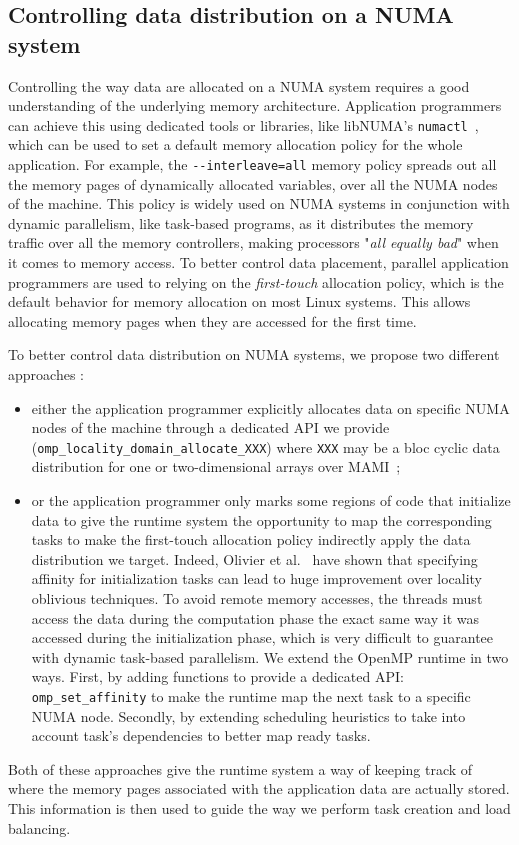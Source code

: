 \documentclass[parallelisme]{compas2016}
\begin{document}
\subsection{Controlling data distribution on a NUMA system}

Controlling the way data are allocated on a NUMA system requires a good understanding of the underlying memory architecture.
Application programmers can achieve this using dedicated tools or libraries, like libNUMA's \verb!numactl!~\cite{DBLP:journals/corr/abs-1101-0093}, which can be used to set a default memory allocation policy for the whole application.
For example, the \verb!--interleave=all! memory policy spreads out all the memory pages of dynamically allocated variables, over all the NUMA nodes of the machine.
This policy is widely used on NUMA systems in conjunction with dynamic parallelism, like task-based programs, as it distributes the memory traffic over all the memory controllers, making processors "\emph{all equally bad}" when it comes to memory access.
To better control data placement, parallel application programmers are used to relying on the \emph{first-touch} allocation policy, which is the default behavior for memory allocation on most Linux systems.
This allows allocating memory pages when they are accessed for the first time.

To better control data distribution on NUMA systems, we propose two different approaches :
\begin{itemize}
\item either the application programmer explicitly allocates data on specific NUMA nodes of the machine through a dedicated API we provide~\cite{Durand2013} (\verb!omp_locality_domain_allocate_XXX!) where \verb/XXX/ may be a bloc cyclic data distribution for one or two-dimensional arrays over MAMI~\cite{BroFurGogWacNam10IJPP};
\item or the application programmer only marks some regions of code that initialize data to give the runtime system the opportunity to map the corresponding tasks to make the first-touch allocation policy indirectly apply the data distribution we target. Indeed, Olivier et al.~\cite{Olivier:2012:CMW:2388996.2389085}
have shown that specifying affinity for initialization tasks can lead to huge improvement over locality oblivious techniques.
To avoid remote memory accesses, the threads must access the data during the computation phase the exact same way it was accessed during the initialization phase, which is very difficult to guarantee with dynamic task-based parallelism.
We extend the OpenMP runtime in two ways. First, by adding functions to provide a dedicated API: \verb!omp_set_affinity! to  make the runtime map the next task to a specific NUMA node. Secondly, by extending scheduling heuristics to take into account task's dependencies to better map ready tasks.
\end{itemize}
Both of these approaches give the runtime system a way of keeping track of where the memory pages associated with the application data are actually stored.
This information is then used to guide the way we perform task creation and load balancing.
\end{document}
